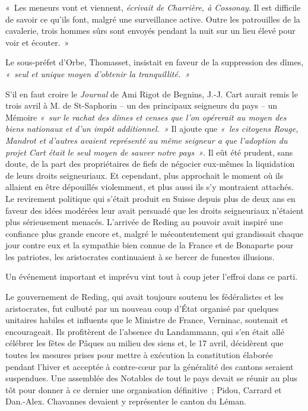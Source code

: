 \documentclass[french,twoside]{book} %
\newenvironment{quoteblock}%
  {\begin{quoting}}
  {\end{quoting}}
\newenvironment{quotebar}{%
    \def\FrameCommand{{\color{rubric!10!}\vrule width 0.5em} \hspace{0.9em}}%
    \def\OuterFrameSep{\itemsep} %
    \MakeFramed {\advance\hsize-\width \FrameRestore}
  }%
  {%
    \endMakeFramed
  }
\renewenvironment{quoteblock}%
  {%
    \savenotes
    \setstretch{0.9}
    \normalfont
    \begin{quotebar}
  }
  {%
    \end{quotebar}
    \spewnotes
  }
\begin{document}
\begin{quoteblock}
\noindent « Les meneurs vont et viennent, \emph{écrivait de Charrière, à Cossonay}. Il est difficile de savoir ce qu’ils font, malgré une surveillance active. Outre les patrouilles de la cavalerie, trois hommes sûrs sont envoyés pendant la nuit sur un lieu élevé pour voir et écouter. »\end{quoteblock}

\noindent Le sous-préfet d’Orbe, Thomasset, insistait en faveur de la suppression des dîmes, \emph{« seul et unique moyen d’obtenir la tranquillité. »}\par
S’il en faut croire le \emph{Journal} de Ami Rigot de Begnins, J.-J. Cart aurait remis le trois avril à M. de St-Saphorin – un des principaux seigneurs du pays – un Mémoire \emph{« sur le rachat des dîmes et censes que l’on opérerait au moyen des biens nationaux et d’un impôt additionnel. »} Il ajoute que \emph{« les citoyens Rouge, Mandrot et d’autres avaient représenté au même seigneur a que l’adoption du projet Cart était le seul moyen de sauver notre pays »}. Il eût été prudent, sans doute, de la part des propriétaires de fiefs de négocier eux-mêmes la liquidation de leurs droits seigneuriaux. Et cependant, plus approchait le moment où ils allaient en être dépouillés violemment, et plus aussi ils s’y montraient attachés. Le revirement politique qui s’était produit en Suisse depuis plus de deux ans en faveur des idées modérées leur avait persuadé que les droits seigneuriaux n’étaient plus sérieusement menacés. L’arrivée de Reding au pouvoir avait inspiré une confiance plus grande encore et, malgré le mécontentement qui grandissait chaque jour contre eux et la sympathie bien connue de la France et de Bonaparte pour les patriotes, les aristocrates continuaient à se bercer de funestes illusions.\par
Un événement important et imprévu vint tout à coup jeter l’effroi dans ce parti.\par
Le gouvernement de Reding, qui avait toujours soutenu les fédéralistes et les aristocrates, fut culbuté par un nouveau coup d’État organisé par quelques unitaires habiles et influents que le Ministre de France, Verninac, soutenait et encourageait. Ils profitèrent de l’absence du Landammann, qui s’en était allé célébrer les fêtes de Pâques au milieu des siens et, le 17 avril, décidèrent que toutes les mesures prises pour mettre à exécution la constitution élaborée pendant l’hiver et acceptée à contre-cœur par la généralité des cantons seraient suspendues. Une assemblée des Notables de tout le pays devait se réunir au plus tôt pour donner à ce dernier une organisation définitive ; Pidou, Carrard et Dan.-Alex. Chavannes devaient y représenter le canton du Léman.\par
\end{document}
